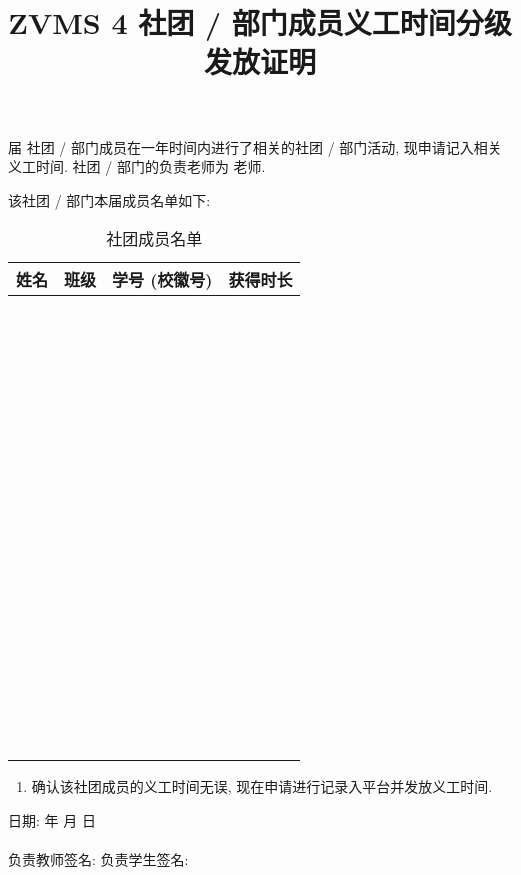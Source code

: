 \documentclass{article}
\title{ZVMS 4 社团 / 部门成员义工时间分级发放证明}
\date{}
\begin{document}
\maketitle

\underline{\hspace{3em}} 届 \underline{\hspace{5em}} 社团 / 部门成员在一年时间内进行了相关的社团 / 部门活动, 现申请记入相关义工时间. 社团 / 部门的负责老师为 \underline{\hspace{5em}} 老师.

该社团 / 部门本届成员名单如下:

\begin{table}[H]
  \centering
  \begin{tabular}{|c|c|c|c|}
    \hline
    \textbf{\hspace{2em}姓名\hspace{2em}} & \textbf{\hspace{2em}班级\hspace{2em}} & \textbf{\hspace{2em}学号 (校徽号)\hspace{2em}} & \textbf{\hspace{1em}获得时长\hspace{1em}} \\
    \hline
    ~&~&~&~\\\hline~&~&~&~\\\hline~&~&~&~\\\hline~&~&~&~\\\hline~&~&~&~\\\hline~&~&~&~\\\hline~&~&~&~\\\hline~&~&~&~\\\hline~&~&~&~\\\hline~&~&~&~\\\hline~&~&~&~\\\hline
    ~&~&~&~\\\hline~&~&~&~\\\hline~&~&~&~\\\hline~&~&~&~\\\hline~&~&~&~\\\hline
  \end{tabular}
  \caption{社团成员名单}
\end{table}

\begin{enumerate}[label=$\square$]
  \item 确认该社团成员的义工时间无误, 现在申请进行记录入平台并发放义工时间.
\end{enumerate}

\begin{flushright}
  日期: \underline{\hspace{4em}} 年 \underline{\hspace{2em}} 月 \underline{\hspace{2em}} 日
  ~\\~\\
  负责教师签名: \underline{\hspace{6em}} \hspace{1em}
  负责学生签名: \underline{\hspace{6em}}
\end{flushright}
\end{document}

